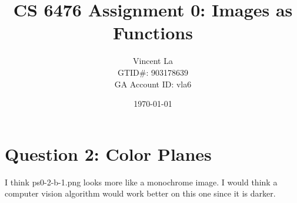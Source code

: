\documentclass[12pt,a4paper]{article}
\author{Vincent La 
\\
GTID\#: 903178639
\\
GA Account ID: vla6}
\title{CS 6476 Assignment 0: Images as Functions}
\date{\today}
\begin{document}
\maketitle

\section{Question 2: Color Planes}
I think ps0-2-b-1.png looks more like a monochrome image. I would think a computer vision algorithm would work better on this one since it is darker.
\end{document}
